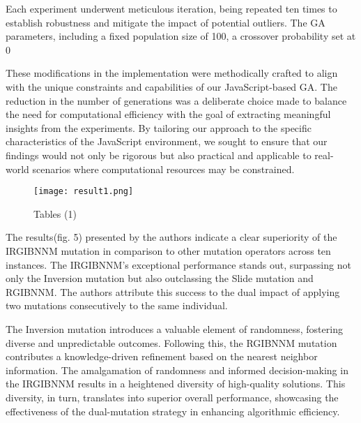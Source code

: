 \documentclass[conference]{IEEEtran}
\begin{document}
Each experiment underwent meticulous iteration, being repeated ten times to establish robustness and mitigate the impact of potential outliers. The GA parameters, including a fixed population size of 100, a crossover probability set at 0%

These modifications in the implementation were methodically crafted to align with the unique constraints and capabilities of our JavaScript-based GA. The reduction in the number of generations was a deliberate choice made to balance the need for computational efficiency with the goal of extracting meaningful insights from the experiments. By tailoring our approach to the specific characteristics of the JavaScript environment, we sought to ensure that our findings would not only be rigorous but also practical and applicable to real-world scenarios where computational resources may be constrained.

\begin{figure}[t!]
\center
\texttt{[image: result1.png]}
\caption{ Tables (1) }
\label{fig}
\end{figure}

The results(fig. 5) presented by the authors indicate a clear superiority of the IRGIBNNM mutation in comparison to other mutation operators across ten instances. The IRGIBNNM's exceptional performance stands out, surpassing not only the Inversion mutation but also outclassing the Slide mutation and RGIBNNM. The authors attribute this success to the dual impact of applying two mutations consecutively to the same individual.

The Inversion mutation introduces a valuable element of randomness, fostering diverse and unpredictable outcomes. Following this, the RGIBNNM mutation contributes a knowledge-driven refinement based on the nearest neighbor information. The amalgamation of randomness and informed decision-making in the IRGIBNNM results in a heightened diversity of high-quality solutions. This diversity, in turn, translates into superior overall performance, showcasing the effectiveness of the dual-mutation strategy in enhancing algorithmic efficiency.
\end{document}
